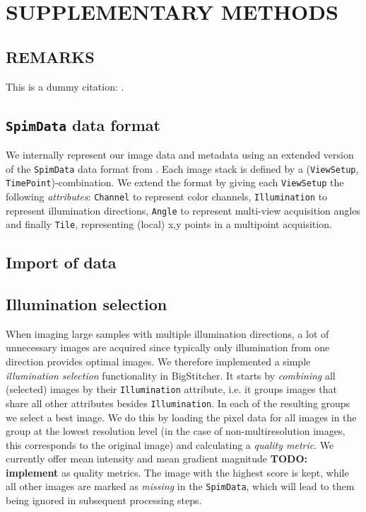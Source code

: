 \section{SUPPLEMENTARY METHODS}
\label{sec:sup-methods}

\subsection*{REMARKS}

This is a dummy citation: \cite{dummy-cite}.

\subsection{\texttt{SpimData} data format}

We internally represent our image data and metadata using an extended version of the \texttt{SpimData} data format from \cite{bigdataviewer}. Each image stack is defined by a (\texttt{ViewSetup}, \texttt{TimePoint})-combination. We extend the format by giving each \texttt{ViewSetup} the following \emph{attributes}: \texttt{Channel} to represent color channels, \texttt{Illumination} to represent illumination directions, \texttt{Angle} to represent multi-view acquisition angles and finally \texttt{Tile}, representing (local) x,y points in a multipoint acquisition.

\subsection{Import of data}

\subsection{Illumination selection}

When imaging large samples with multiple illumination directions,  a lot of unnecessary images are acquired since typically only illumination from one direction provides optimal images. We therefore implemented a simple \emph{illumination selection} functionality in BigStitcher. It starts by \emph{combining} all (selected) images by their \texttt{Illumination} attribute, i.e. it groups images that share all other attributes besides \texttt{Illumination}. In each of the resulting groups we select a best image. We do this by loading the pixel data for all images in the group at the lowest resolution level (in the case of non-multiresolution images, this corresponds to the original image) and calculating a \emph{quality metric}. We currently offer mean intensity and mean gradient magnitude \textbf{TODO: implement} as quality metrics. The image with the highest score is kept, while all other images are marked as \emph{missing} in the \texttt{SpimData}, which will lead to them being ignored in subsequent processing steps. 

